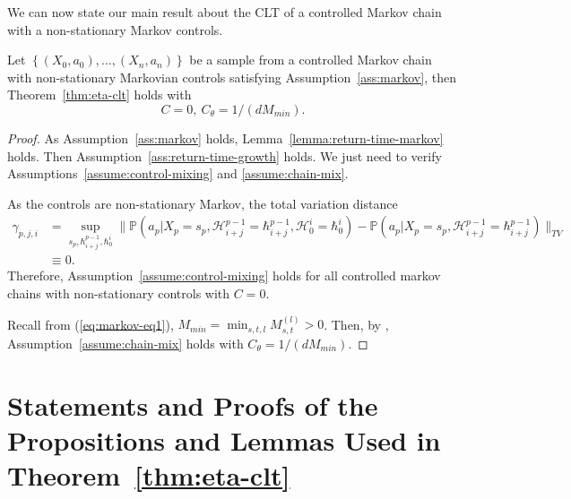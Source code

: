\documentclass[twoside,11pt]{article}
\newcommand{\pow}[1]{^{(#1)}}%
\numberwithin{equation}{section}
\newcommand{\lp}{\left(}
\newcommand{\rp}{\right)}
\newcommand{\History}{\mathcal{H}}
\newcommand{\history}{\hbar}
\newcommand{\Pbb}{\mathbb{P}}
\newcommand{\indexeddata}{\left\{(X_0,a_0),\dots,(X_n,a_n)\right\}}
\newcommand{\prob}{\Pbb}
\newcommand{\probl}{\prob}
\begin{document}
We can now state our main result about the CLT of a controlled Markov chain with a non-stationary Markov controls. 
\begin{proposition}\label{prop:markov-mdp}
Let $\indexeddata$ be a sample from a controlled Markov chain with non-stationary Markovian controls satisfying Assumption~\ref{ass:markov}, then Theorem~\ref{thm:eta-clt} holds with
\[
C = 0, \ C_\theta=1/(d M_{min}).
\]
\end{proposition}
\begin{proof}
    As Assumption~\ref{ass:markov} holds, Lemma~\ref{lemma:return-time-markov} holds. Then Assumption~\ref{ass:return-time-growth} holds. 
    We just need to verify Assumptions~\ref{assume:control-mixing} and \ref{assume:chain-mix}.

    As the controls are non-stationary Markov, the total variation distance
    \begin{align*}
\gamma_{p,j,i} & = 
    \sup_{s_p, \history_{i+j}^{p-1}, \history_0^i} 
    \Big\lVert 
        \probl\lp 
            a_p \Big| X_p = s_p, \History_{i+j}^{p-1} = \history_{i+j}^{p-1}, \History_0^i = \history_{0}^i
        \rp - 
        \probl\lp  
            a_p \Big| X_p = s_p, \History_{i+j}^{p-1} = \history_{i+j}^{p-1}
        \rp
    \Big\rVert_{TV} \\
    & \equiv 0.
\end{align*}
Therefore, Assumption~\ref{assume:control-mixing} holds for all controlled markov chains with non-stationary controls with $C=0$.

Recall from (\ref{eq:markov-eq1}), $M_{min} = \min_{s,t,l} M_{s,t} \pow l > 0$.
Then, by \citet[Lemma 12]{banerjee2025off}, Assumption~\ref{assume:chain-mix} holds with $C_\theta = 1/(d M_{min})$.
\end{proof}

\section{Statements and Proofs of the Propositions and Lemmas Used in Theorem~\ref{thm:eta-clt}}
\end{document}
